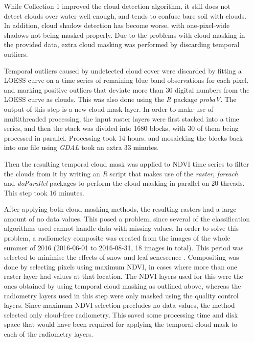 \documentclass[a4paper,10pt]{book}
\begin{document}
While Collection 1 improved the cloud detection algorithm, it still does not detect clouds over water well enough, and tends to confuse bare soil with clouds. In addition, cloud shadow detection has become worse, with one-pixel-wide shadows not being masked properly. Due to the problems with cloud masking in the provided data, extra cloud masking was performed by discarding temporal outliers.

Temporal outliers caused by undetected cloud cover were discarded by fitting a LOESS curve on a time series of remaining blue band observations for each pixel, and marking positive outliers that deviate more than 30 digital numbers from the LOESS curve as clouds. This was also done using the \textit{R} package \textit{probaV}. The output of this step is a new cloud mask layer. In order to make use of multithreaded processing, the input raster layers were first stacked into a time series, and then the stack was divided into 1680 blocks, with 30 of them being processed in parallel. Processing took 14 hours, and mosaicking the blocks back into one file using \textit{GDAL} took an extra 33 minutes.

Then the resulting temporal cloud mask was applied to NDVI time series to filter the clouds from it by writing an \textit{R} script that makes use of the \textit{raster}, \textit{foreach} and \textit{doParallel} packages to perform the cloud masking in parallel on 20 threads. This step took 16 minutes.

After applying both cloud masking methods, the resulting rasters had a large amount of no data values. This posed a problem, since several of the classification algorithms used cannot handle data with missing values. In order to solve this problem, a radiometry composite was created from the images of the whole summer of 2016 (2016-06-01 to 2016-08-31, 18 images in total). This period was selected to minimise the effects of snow and leaf senescence \citep{bartalev2014probavboreal}. Compositing was done by selecting pixels using maximum NDVI, in cases where more than one raster layer had values at that location. The NDVI layers used for this were the ones obtained by using temporal cloud masking as outlined above, whereas the radiometry layers used in this step were only masked using the quality control layers. Since maximum NDVI selection precludes no data values, the method selected only cloud-free radiometry. This saved some processing time and disk space that would have been required for applying the temporal cloud mask to each of the radiometry layers.
\end{document}
